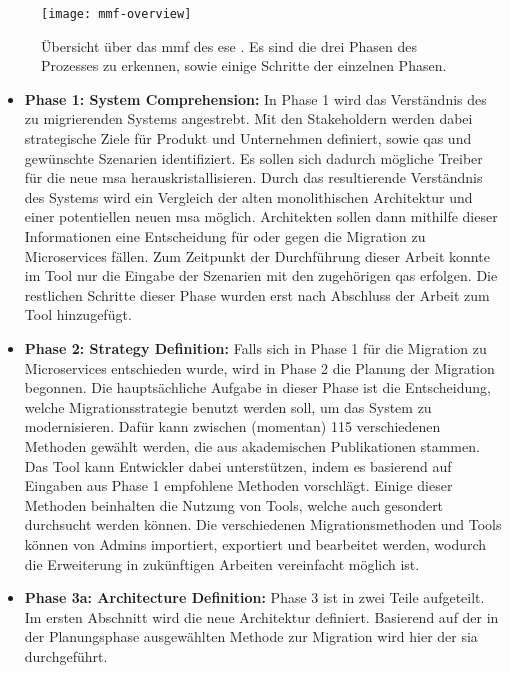 \begin{figure}
	\centering
	\texttt{[image: mmf-overview]}
	\caption[Übersicht über \acrshort{mmf}]{
		Übersicht über das \gls{mmf} des \gls{ese} \cite{fritzsch2022architecturecentric}. Es sind die drei Phasen des Prozesses zu erkennen, sowie einige Schritte der einzelnen Phasen.
	}
	\label{fig:mmf-overview}
\end{figure}

\begin{itemize}
	\item \textbf{Phase 1: System Comprehension:}
	In Phase 1 wird das Verständnis des zu migrierenden Systems angestrebt.
	Mit den Stakeholdern werden dabei strategische Ziele für Produkt und Unternehmen definiert, sowie \glspl{qa} und gewünschte Szenarien identifiziert.
	Es sollen sich dadurch mögliche Treiber für die neue \acrlong{msa} herauskristallisieren.
	Durch das resultierende Verständnis des Systems wird ein Vergleich der alten monolithischen Architektur und einer potentiellen neuen \acrlong{msa} möglich.
	Architekten sollen dann mithilfe dieser Informationen eine Entscheidung für oder gegen die Migration zu Microservices fällen.
	Zum Zeitpunkt der Durchführung dieser Arbeit konnte im Tool nur die Eingabe der Szenarien mit den zugehörigen \glspl{qa} erfolgen.
	Die restlichen Schritte dieser Phase wurden erst nach Abschluss der Arbeit zum Tool hinzugefügt.
	\item \textbf{Phase 2: Strategy Definition:}
	Falls sich in Phase 1 für die Migration zu Microservices entschieden wurde, wird in Phase 2 die Planung der Migration begonnen.
	Die hauptsächliche Aufgabe in dieser Phase ist die Entscheidung, welche Migrationsstrategie benutzt werden soll, um das System zu modernisieren.
	Dafür kann zwischen (momentan) 115 verschiedenen Methoden gewählt werden, die aus akademischen Publikationen stammen.
	Das Tool kann Entwickler dabei unterstützen, indem es basierend auf Eingaben aus Phase 1 empfohlene Methoden vorschlägt.
	Einige dieser Methoden beinhalten die Nutzung von Tools, welche auch gesondert durchsucht werden können.
	Die verschiedenen Migrationsmethoden und Tools können von Admins importiert, exportiert und bearbeitet werden, wodurch die Erweiterung in zukünftigen Arbeiten vereinfacht möglich ist.
	\item \textbf{Phase 3a: Architecture Definition:}
	Phase 3 ist in zwei Teile aufgeteilt.
	Im ersten Abschnitt wird die neue Architektur definiert.
	Basierend auf der in der Planungsphase ausgewählten Methode zur Migration wird hier der \gls{sia} durchgeführt.

\end{itemize}
